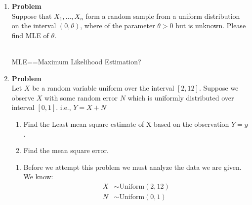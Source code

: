 \documentclass[12pt]{article}
\newenvironment{Ex}{\textbf{Problem}\vspace{.75em}\\}{}
\begin{document}
\begin{enumerate}
\begin{Ex}
\begin{solution}
\begin{enumerate}
        \begin{equation}
          \label{eq:1c-detection-error}
          \begin{aligned}
            P_e &= P(H_0)P(N\le n^*|H_0) +  P(H_1)P(N\le n^*|H_1) \\
            &= (0.9)(0.00458967) + (0.1)(0.00872796) \\
            \implies P_e &= 0.0049139 \\
          \end{aligned}
        \end{equation}
      \end{enumerate}
    \end{solution}
  \end{Ex}
\pagebreak[4]
\item
  \begin{Ex}
    Suppose that $X_1,\ldots,X_n$ form a random sample from a uniform
    distribution on the interval $(0,\theta)$, where of the parameter
    $\theta > 0$ but is unknown. Please find MLE of $\theta$.
    \begin{solution} \hfill
      \\ {\huge \color{red} MLE==Maximum Likelihood Estimation?}
    \end{solution}
  \end{Ex}
\item
  \begin{Ex}
    Let $X$ be a random variable uniform over the interval $[2,
    12]$. Suppose we observe $X$ with some random error $N$ which is
    uniformly distributed over interval $[0,1]$. i.e., $Y=X+N$
    \begin{enumerate}
    \item Find the Least mean square estimate of X based on the
      observation $Y = y$.
    \item Find the mean square error.
    \end{enumerate}
    \begin{solution} \hfill
      \begin{enumerate}
      \item Before we attempt this problem we must analyze the data we
        are given. We know:
        \begin{equation}
          \label{eq:3a-defs}
          \begin{aligned}
            X&\sim\text{Uniform}(2,12) \\
            N&\sim\text{Uniform}(0,1) \\

\end{aligned}
\end{equation}
\end{enumerate}
\end{solution}
\end{Ex}
\end{enumerate}
\end{document}
